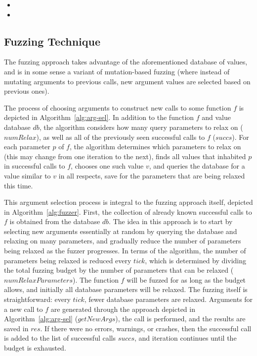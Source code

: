 \begin{itemize}
    \item {}
    \item {}
\end{itemize}

\subsection{Fuzzing Technique}


The fuzzing approach takes advantage of the aforementioned database of values, and is in some sense a variant of mutation-based fuzzing (where instead of mutating arguments to previous calls, new argument values are selected based on previous ones).

The process of choosing arguments to construct new calls to some function $f$ is depicted in Algorithm~\ref{alg:arg-sel}.
In addition to the function $f$ and value database $db$, the algorithm considers how many query parameters to relax on ($numRelax$), as well as all of the previously seen successful calls to $f$ ($succs$).
For each parameter $p$ of $f$, the algorithm determines which parameters to relax on (this may change from one iteration to the next), finds all values that inhabited $p$ in successful calls to $f$, chooses one such value $v$, and queries the database for a value similar to $v$ in all respects, save for the parameters that are being relaxed this time.

This argument selection process is integral to the fuzzing approach itself, depicted in Algorithm~\ref{alg:fuzzer}.
First, the collection of already known successful calls to $f$ is obtained from the database $db$.
The idea in this approach is to start by selecting new arguments essentially at random by querying the database and relaxing on many parameters, and gradually reduce the number of parameters being relaxed as the fuzzer progresses.
In terms of the algorithm, the number of parameters being relaxed is reduced every $tick$, which is determined by dividing the total fuzzing budget by the number of parameters that can be relaxed ($numRelaxParameters$).
The function $f$ will be fuzzed for as long as the budget allows, and initially all database parameters will be relaxed.
The fuzzing itself is straightforward: every $tick$, fewer database parameters are relaxed.
Arguments for a new call to $f$ are generated through the approach depicted in Algorithm~\ref{alg:arg-sel} ($getNewArgs$), the call is performed, and the results are saved in $res$.
If there were no errors, warnings, or crashes, then the successful call is added to the list of successful calls $succs$, and iteration continues until the budget is exhausted.

